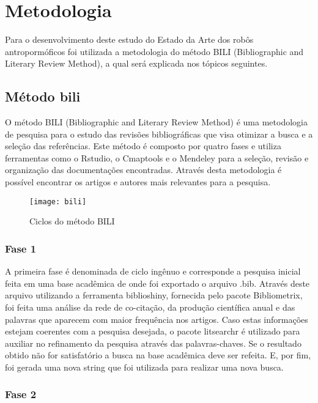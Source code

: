 \chapter{Metodologia}
\label{chap:metod}

Para o desenvolvimento deste estudo do Estado da Arte dos robôs antropormóficos foi utilizada a metodologia do método BILI (Bibliographic and Literary Review Method), a qual será explicada nos tópicos seguintes.

\section{Método bili}
\label{sec:bili}

O método BILI (Bibliographic and Literary Review Method) é uma metodologia de pesquisa para o estudo das revisões bibliográficas que visa otimizar a busca e a seleção das referências. Este método é composto por quatro fases e utiliza  ferramentas como o  Rstudio, o Cmaptools e o Mendeley para a seleção, revisão e organização das documentações encontradas. Através desta metodologia é possível encontrar os artigos e autores mais relevantes para a pesquisa.

\begin{figure} [H]	
    \centering
    \caption{Ciclos do método BILI}
    \texttt{[image: bili]}
    \label{fig:bili}
\end{figure}

\subsection{Fase 1}
\label{sec:fase1}

A primeira fase é denominada de ciclo ingênuo e corresponde a pesquisa inicial feita em uma base acadêmica  de onde foi exportado o arquivo .bib. Através deste arquivo utilizando a ferramenta biblioshiny, fornecida pelo pacote Bibliometrix, foi feita uma análise da rede de co-citação, da produção científica anual e das palavras que aparecem com maior frequência nos artigos. Caso estas informações estejam coerentes com a pesquisa desejada, o pacote litsearchr é utilizado para auxiliar no refinamento da pesquisa através das palavras-chaves. Se o resultado obtido não for satisfatório a busca na base acadêmica deve ser refeita. E, por fim, foi gerada uma nova string que foi utilizada para realizar uma nova busca. 


\subsection{Fase 2}
\label{sec:fase2}

